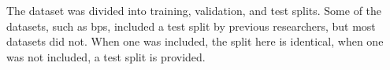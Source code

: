 
The dataset was divided into training, validation, and test
splits. Some of the datasets, such as \gls{bps}, included a
test split by previous researchers, but most datasets did
not. When one was included, the split here is identical,
when one was not included, a test split is provided.
